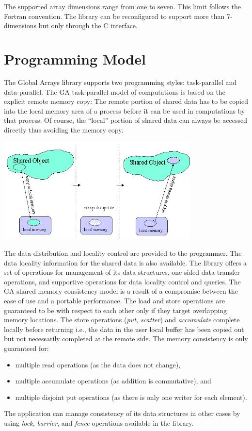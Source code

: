 The supported array dimensions range from one to seven. This limit follows the
Fortran convention. The library can be reconfigured to support more than
7-dimensions but only through the C interface. 

\section{Programming Model}

The Global Arrays library supports two programming styles: task-parallel and
data-parallel. The GA task-parallel model of computations is based on the
explicit remote memory copy: The remote portion of shared data has to be copied
into the local memory area of a process before it can be used in computations
by that process. Of course, the ``local'' portion of shared data can always be
accessed directly thus avoiding the memory copy. 

\includegraphics[width=4in]{mod}

The data distribution and locality control are provided to the programmer.  The
data locality information for the shared data is also available.  The library
offers a set of operations for management of its data structures, one-sided
data transfer operations, and supportive operations for data locality control
and queries. The GA shared memory consistency model is a result of a compromise
between the ease of use and a portable performance. The load and store
operations are guaranteed to be  with respect to each other only
if they target overlapping memory locations. The store operations (\emph{put,
scatter}) and \emph{accumulate} complete locally before returning i.e., the
data in the user local buffer has been copied out but not necessarily completed
at the remote side. The memory consistency is only guaranteed for: 
\begin{itemize}
\item multiple read operations (as the data does not change), 
\item multiple accumulate operations (as addition is commutative), and 
\item multiple disjoint put operations (as there is only one writer for each
element). 
\end{itemize}
The application can manage consistency of its data structures in other cases by
using \emph{lock, barrier}, and \emph{fence} operations available in the
library. 

